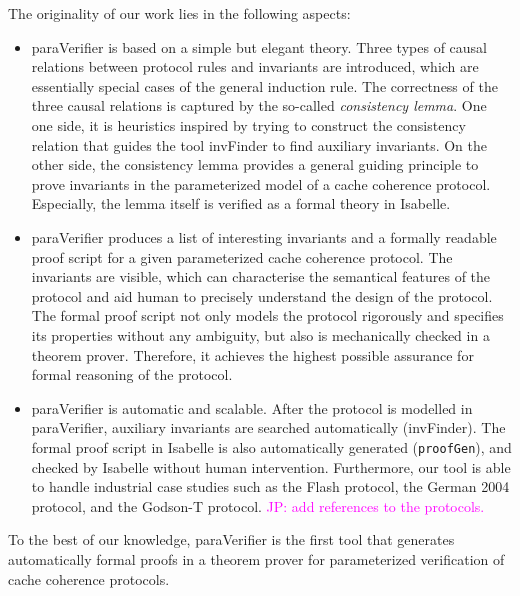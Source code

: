 \documentclass{llncs}
\newcommand\JP[1]{\textcolor{magenta}{JP: #1}}
\begin{document}
The originality of our work lies in the following aspects:
\begin{itemize}
\item {\sf paraVerifier} is based on a simple but elegant theory. Three types of causal
relations between protocol rules and invariants are introduced, which are
essentially special cases of the general induction rule.
The correctness of the three causal relations is captured
by the so-called \emph{consistency lemma}.
One one side, it is heuristics inspired by trying to
construct the consistency relation that guides the tool {\sf
invFinder} to find auxiliary invariants. On the other side, the
consistency lemma provides a general guiding principle to prove
invariants  in the parameterized model of a cache coherence
protocol. Especially, the lemma itself is verified as a
formal theory in Isabelle.

\item {\sf paraVerifier} produces a list of interesting invariants
and a formally readable proof script for a given parameterized cache coherence protocol.
The invariants are visible,
which can characterise the semantical features of the protocol and aid human to
precisely understand the design of the protocol.
The formal proof script not only models the protocol
rigorously and specifies its properties without any ambiguity, but also
is mechanically checked in a theorem prover.
Therefore, it achieves the highest possible
assurance for formal reasoning of the protocol.

\item {\sf paraVerifier} is automatic and scalable.
After the protocol is modelled in {\sf paraVerifier}, auxiliary invariants
are searched automatically ({\sf invFinder}).
The formal proof script in Isabelle is also automatically generated ({\tt proofGen}),
and checked by Isabelle without human intervention.
Furthermore, our tool is able to handle industrial case studies such as
the Flash protocol, the German 2004 protocol, and the Godson-T protocol.
\JP{add references to the protocols.}
\end{itemize}

To the best of our knowledge, {\sf paraVerifier} is the first tool
that generates automatically formal proofs in a theorem prover for
parameterized verification of cache coherence protocols.
\end{document}
